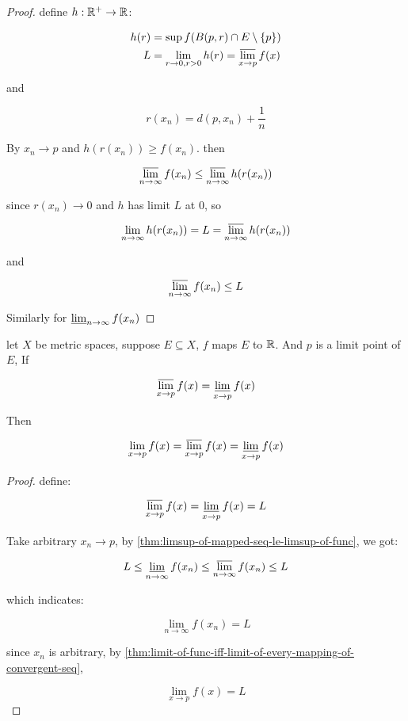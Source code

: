 \begin{proof}
    define $h: \mathbb{R}^+ \to \mathbb{R}$:

    \begin{align*}
        h(r) &= \sup f(B(p, r) \cap E \setminus \{ p \}) \\
        L &= \lim_{r \to 0, r > 0} h(r) = \varlimsup_{x \to p}f(x)
    \end{align*}

    and

    \[
        r(x_n) = d(p, x_n) + \frac{1}{n}
    \]

    By $x_n \to p$ and $h(r(x_n)) \ge f(x_n)$. then

    \[
        \varlimsup_{n \to \infty} f(x_n) \le \varlimsup_{n \to \infty}h(r(x_n))
    \]

    since $r(x_n) \to 0$ and $h$ has limit $L$ at $0$, so

    \[
        \lim_{n \to \infty}h(r(x_n)) = L = \varlimsup_{n \to \infty}h(r(x_n))
    \]

    and

    \[
        \varlimsup_{n \to \infty} f(x_n) \le L
    \]

    Similarly for $\varliminf_{n \to \infty}f(x_n)$
\end{proof}

\begin{thm}
    let $X$ be metric spaces, suppose $E \subseteq X$, $f$ maps $E$ to $\mathbb{R}$. 
    And $p$ is a limit point of $E$, If

    \[
        \varlimsup_{x \to p}f(x) =  \varliminf_{x \to p}f(x)
    \]

    Then

    \[
        \lim_{x \to p}f(x)= \varlimsup_{x \to p}f(x) = \varliminf_{x \to p}f(x)
    \]
\end{thm}

\begin{proof}
    define:

    \[
        \varlimsup_{x \to p}f(x) =  \varliminf_{x \to p}f(x) = L
    \]

    Take arbitrary $x_n \to p$, by \autoref{thm:limsup-of-mapped-seq-le-limsup-of-func}, we got:
    
    \[
       L \le \varliminf_{n \to \infty}f(x_n) \le  \varlimsup_{n \to \infty}f(x_n) \le L
    \]

    which indicates:

    \[
        \lim_{n \to \infty}f(x_n) = L
    \]

    since $x_n$ is arbitrary, by \autoref{thm:limit-of-func-iff-limit-of-every-mapping-of-convergent-seq},

    \[
        \lim_{x \to p}f(x) = L
    \]
\end{proof}

